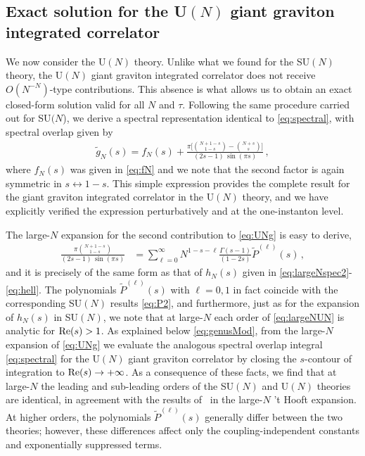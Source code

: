 \documentclass[aps,prl,twocolumn, longbibliography,footinbib,superscriptaddress, preprintnumbers]{revtex4-1}
\newcommand{\<}{\langle}
\renewcommand{\>}{\rangle}
\begin{document}
\subsection{Exact solution for the U$(N)$ giant graviton integrated correlator}
\vspace{-0.2cm}

We now consider the  $\mathrm{U}(N)$ theory. Unlike what we found for the SU$(N)$ theory, the U$(N)$ giant graviton integrated correlator does not receive $O(N^{-N})$-type contributions. This absence is what allows us to obtain an exact closed-form solution valid for all $N$ and $\tau$. Following the same procedure carried out for SU$(N$),  we derive a spectral representation identical to \eqref{eq:spectral}, with spectral overlap given by
\begin{align}\label{eq:UNg}
 \tilde{g}_N(s) =
f_N(s)
+ \frac{\pi \big[ \binom{N+1-s}{1-s} - \binom{N+s}{s} \big]}{(2s{-}1)\, \sin(\pi s)} \, ,
\end{align}
where $f_N(s)$ was given in \eqref{eq:fN} and we note that the second factor is again symmetric in $s\leftrightarrow 1-s$.
This simple expression provides the complete result for the giant graviton integrated correlator in the U$(N)$ theory, and we have explicitly verified the expression perturbatively and at the one-instanton level.

The large-$N$ expansion for the second contribution to \eqref{eq:UNg} is easy to derive,
\begin{align}
\frac{\pi  \binom{N+1-s}{1-s}}{(2s{-}1)\, \sin(\pi s)} &\label{eq:largeNUN} = \sum^{\infty}_{\ell=0} N^{1-s-\ell}
   \frac{ \Gamma(s-1)}{(1-2s)} \tilde{P}^{(\ell)}(s) \, ,
\end{align}
and it is precisely of the same form as that of $h_N(s)$ given in \eqref{eq:largeNspec2}-\eqref{eq:hell}.
The polynomials $\tilde{P}^{(\ell)}(s)$ with $\ell=0,1$ in fact coincide with the corresponding SU$(N)$ results \eqref{eq:P2}, and furthermore, just as for the expansion of $h_N(s)$ in SU$(N)$, we note that at large-$N$ each order of \eqref{eq:largeNUN} is analytic for ${\rm Re}(s)>1$.
As explained below \eqref{eq:genusMod}, from the large-$N$ expansion of \eqref{eq:UNg} we evaluate the analogous spectral overlap integral \eqref{eq:spectral} for the U$(N)$ giant graviton correlator by closing the $s$-contour of integration to ${\rm Re}(s)\to +\infty$.
As a consequence of these facts, we find that at large-$N$ the leading and sub-leading orders of the SU$(N)$ and U$(N)$ theories are identical, in agreement with the results of~\cite{Brown:2024tru} in the large-$N$ 't Hooft expansion.  At higher orders, the polynomials $\tilde{P}^{(\ell)}(s)$ generally differ between the two theories; however, these differences  affect only the coupling-independent constants and exponentially suppressed terms.
\end{document}
